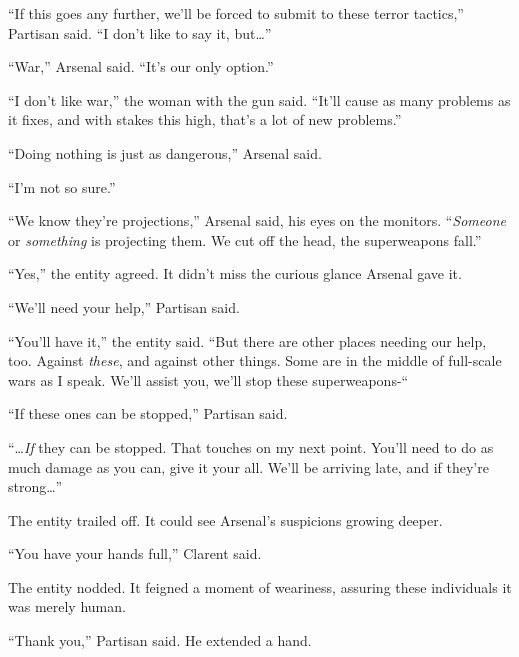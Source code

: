 ``If this goes any further, we'll be forced to submit to these terror tactics,'' Partisan said.  ``I don't like to say it, but\ldots''



``War,'' Arsenal said.  ``It's our only option.''



``I don't like war,'' the woman with the gun said.  ``It'll cause as many problems as it fixes, and with stakes this high, that's a lot of new problems.''



``Doing nothing is just as dangerous,'' Arsenal said.



``I'm not so sure.''



``We know they're projections,'' Arsenal said, his eyes on the monitors.  ``\emph{Someone} or \emph{something} is projecting them.  We cut off the head, the superweapons fall.''



``Yes,'' the entity agreed.  It didn't miss the curious glance Arsenal gave it.



``We'll need your help,'' Partisan said.



``You'll have it,'' the entity said.  ``But there are other places needing our help, too.  Against \emph{these}, and against other things.  Some are in the middle of full-scale wars as I speak.  We'll assist you, we'll stop these superweapons-``



``If these ones can be stopped,'' Partisan said.



``\ldots\emph{If} they can be stopped.  That touches on my next point.  You'll need to do as much damage as you can, give it your all.  We'll be arriving late, and if they're strong\ldots''



The entity trailed off.  It could see Arsenal's suspicions growing deeper.



``You have your hands full,'' Clarent said.



The entity nodded.  It feigned a moment of weariness, assuring these individuals it was merely human.



``Thank you,'' Partisan said.  He extended a hand.



